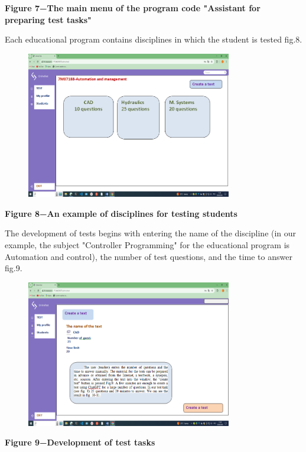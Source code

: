 {\bfseries Figure 7−The main menu of the program code "Assistant for
preparing test tasks"}

Each educational program contains disciplines in which the student is
tested fig.8.

\begin{figure}[H]
	\centering
	\includegraphics[width=0.8\textwidth]{assets/133}
	\caption*{}
\end{figure}

{\bfseries Figure 8−An example of disciplines for testing students}

The development of tests begins with entering the name of the discipline
(in our example, the subject "Controller Programming" for the
educational program is Automation and control), the number of test
questions, and the time to answer fig.9.

\begin{figure}[H]
	\centering
	\includegraphics[width=0.8\textwidth]{assets/134}
	\caption*{}
\end{figure}

{\bfseries Figure 9−Development of test tasks}

